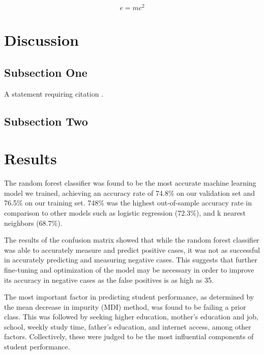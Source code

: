 \documentclass[twoside,twocolumn]{article}
\begin{document}
\blindtext %

\begin{equation}
\label{eq:emc}
e = mc^2
\end{equation}

\blindtext %


\section{Discussion}

\subsection{Subsection One}

A statement requiring citation \cite{Figueredo:2009dg}.
\blindtext %

\subsection{Subsection Two}

\blindtext %

\section{Results}
The random forest classifier was found to be the most accurate machine learning model we trained, achieving an accuracy rate of 74.8\% on our validation set and 76.5\% on our training set. 748\% was the highest out-of-sample accuracy rate in comparison to other models such as logistic regression (72.3\%), and k nearest neighbors (68.7\%).

The results of the confusion matrix showed that while the random forest classifier was able to accurately measure and predict positive cases, it was not as successful in accurately predicting and measuring negative cases. This suggests that further fine-tuning and optimization of the model may be necessary in order to improve its accuracy in negative cases as the false positives is as high as 35.

The most important factor in predicting student performance, as determined by the mean decrease in impurity (MDI) method, was found to be failing a prior class. This was followed by seeking higher education, mother's education and job, school, weekly study time, father's education, and internet access, among other factors. Collectively, these were judged to be the most influential components of student performance.
\end{document}
